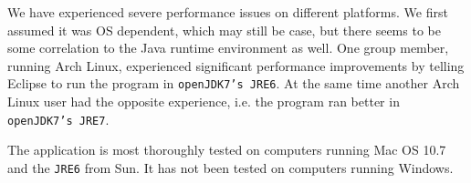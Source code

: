 We have experienced severe performance issues on different platforms. We first assumed it was OS dependent, which may still be case, but there seems to be some correlation to the Java runtime environment as well. One group member, running Arch Linux, experienced significant performance improvements by telling Eclipse to run the program in \texttt{openJDK7's JRE6}. At the same time another Arch Linux user had the opposite experience, i.e. the program ran better in \texttt{openJDK7's JRE7}.

The application is most thoroughly tested on computers running Mac OS 10.7 and the \texttt{JRE6} from Sun. It has not been tested on computers running Windows.